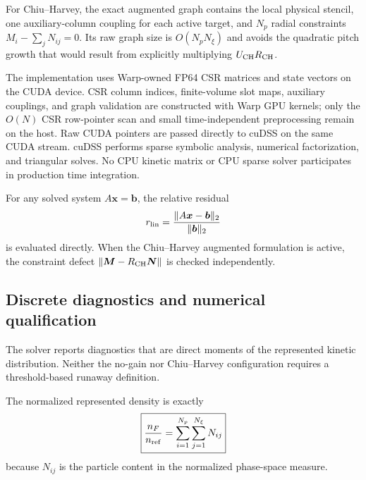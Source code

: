 \documentclass[11pt]{article}
\begin{document}
For Chiu--Harvey, the exact augmented graph contains the local physical stencil, one
auxiliary-column coupling for each active target, and $N_p$ radial constraints
$M_i-\sum_jN_{ij}=0$.  Its raw graph size is $O(N_pN_\xi)$ and avoids the quadratic
pitch growth that would result from explicitly multiplying $U_{\rm CH}R_{\rm CH}$.

The implementation uses Warp-owned FP64 CSR matrices and state vectors on the CUDA
device.  CSR column indices, finite-volume slot maps, auxiliary couplings, and graph
validation are constructed with Warp GPU kernels; only the $O(N)$ CSR row-pointer scan
and small time-independent preprocessing remain on the host.  Raw CUDA pointers are
passed directly to cuDSS on the same CUDA stream.  cuDSS performs sparse symbolic
analysis, numerical factorization, and triangular solves.  No CPU kinetic matrix or CPU
sparse solver participates in production time integration.

For any solved system $A\bm x=\bm b$, the relative residual
\begin{equation}
 r_{\rm lin}=\frac{\|A\bm x-\bm b\|_2}{\|\bm b\|_2}
 \label{eq:linear_residual}
\end{equation}
is evaluated directly.  When the Chiu--Harvey augmented formulation is active, the
constraint defect $\|\bm M-R_{\rm CH}\bm N\|$ is checked independently.

\subsection{Discrete diagnostics and numerical qualification}

The solver reports diagnostics that are direct moments of the represented kinetic
distribution.  Neither the no-gain nor Chiu--Harvey configuration requires a
threshold-based runaway definition.

The normalized represented density is exactly
\begin{equation}
 \boxed{
 \frac{n_F}{n_{\rm ref}}=\sum_{i=1}^{N_p}\sum_{j=1}^{N_\xi}N_{ij}
 }
 \label{eq:discrete_density}
\end{equation}
because $N_{ij}$ is the particle content in the normalized phase-space measure.
\end{document}
